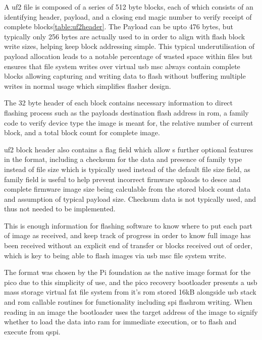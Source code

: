 {A \gls{uf2} file is composed of a series of 512 byte blocks, each of which consists of an identifying header, payload, and a closing end magic number to verify receipt of complete blocks\autoref{table:uf2header}. The Payload can be upto 476 bytes, but typically only 256 bytes are actually used to in order to align with flash block write sizes, helping keep block addressing simple. This typical underutilisation of payload allocation leads to a notable percentage of wasted space within files but ensures that file system writes over virtual \gls{usb} \gls{msc} always contain complete blocks\cite{USBFlashingFormat2023} allowing capturing and writing data to flash without buffering multiple writes in normal usage which simplifies flasher design. 

The 32 byte header of each block contains necessary information to direct flashing process such as the payloads destination flash address in \gls{rom}, a family code to verify device type the image is meant for, the relative number of current block, and a total block count for complete image.

\gls{uf2} block header also contains a flag field which allow s further optional features in the format, including a checksum for the data and presence of family type instead of file size which is typically used instead of the default file size field, as family field is useful to help prevent incorrect firmware uploads to desce and complete firmware image size being calculable from the stored block count data and assumption of typical payload size. Checksum data is not typically used, and thus not needed to be implemented.

This is enough information for flashing software to know where to put each part of image as received, and keep track of progress in order to know full image has been received without an explicit end of transfer or blocks received out of order, which is key to being able to flash images via \gls{usb} \gls{msc} file system write.

The format was chosen by the Pi foundation as the native image format for the pico due to this simplicity of use, and the pico recovery bootloader presents a \gls{usb} mass storage virtual \gls{fat} file system from it's \gls{rom} stored 16kB alongside \gls{usb} stack and \gls{rom} callable routines for functionality including \gls{spi} flashrom writing. When reading in an image the bootloader uses the target address of the image to signify whether to load the data into ram for immediate execution, or to flash and execute from \gls{qspi}.

}
